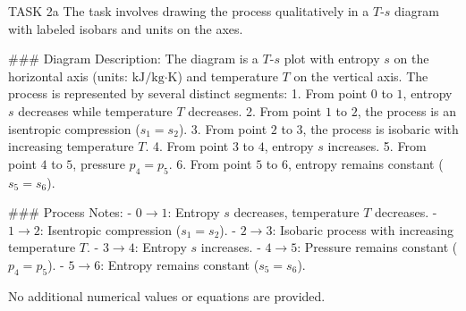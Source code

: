 TASK 2a  
The task involves drawing the process qualitatively in a \( T \)-\( s \) diagram with labeled isobars and units on the axes.  

### Diagram Description:  
The diagram is a \( T \)-\( s \) plot with entropy \( s \) on the horizontal axis (units: \( \text{kJ/kg·K} \)) and temperature \( T \) on the vertical axis. The process is represented by several distinct segments:  
1. From point \( 0 \) to \( 1 \), entropy \( s \) decreases while temperature \( T \) decreases.  
2. From point \( 1 \) to \( 2 \), the process is an isentropic compression (\( s_1 = s_2 \)).  
3. From point \( 2 \) to \( 3 \), the process is isobaric with increasing temperature \( T \).  
4. From point \( 3 \) to \( 4 \), entropy \( s \) increases.  
5. From point \( 4 \) to \( 5 \), pressure \( p_4 = p_5 \).  
6. From point \( 5 \) to \( 6 \), entropy remains constant (\( s_5 = s_6 \)).  

### Process Notes:  
- \( 0 \rightarrow 1 \): Entropy \( s \) decreases, temperature \( T \) decreases.  
- \( 1 \rightarrow 2 \): Isentropic compression (\( s_1 = s_2 \)).  
- \( 2 \rightarrow 3 \): Isobaric process with increasing temperature \( T \).  
- \( 3 \rightarrow 4 \): Entropy \( s \) increases.  
- \( 4 \rightarrow 5 \): Pressure remains constant (\( p_4 = p_5 \)).  
- \( 5 \rightarrow 6 \): Entropy remains constant (\( s_5 = s_6 \)).  

No additional numerical values or equations are provided.